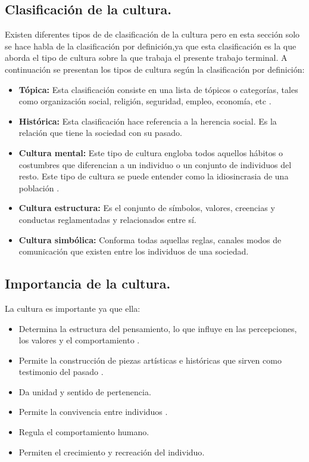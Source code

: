 	\subsection{Clasificación de la cultura.}\label{CulturaClasi}
	Existen diferentes tipos de de clasificación de la cultura pero en esta sección solo 
	se hace habla de la clasificación por definición,ya que esta clasificación es la que 
	aborda el tipo de cultura sobre la que trabaja el presente trabajo terminal. A 
	continuación se presentan los tipos de cultura según la clasificación por definición:
	\begin{itemize}
		\item \textbf{Tópica:} Esta clasificación consiste en una lista de tópicos o 
		categorías, tales como organización social, religión, seguridad, empleo, economía, 
		etc \cite{RefculturaClasificacion}.
		\item \textbf{Histórica:} Esta clasificación hace referencia a la herencia social. 
		Es la relación que tiene la sociedad con su pasado\cite{RefculturaClasificacionEl}. 
		\item \textbf{Cultura mental:} Este tipo de cultura engloba todos aquellos hábitos 
		o costumbres que diferencian a un individuo o un conjunto de individuos del resto. 
		Este tipo de cultura se puede entender como la idiosincrasia de una población
		\cite{RefculturaClasificacion}.
		\item \textbf{Cultura estructura:} Es el conjunto de símbolos, valores, creencias 
		y conductas reglamentadas y relacionados entre sí\cite{RefculturaClasificacionEl}. 
		\item \textbf{Cultura simbólica:} Conforma todas aquellas reglas, canales  modos 
		de comunicación que existen entre los individuos de una 
		sociedad\cite{RefculturaClasificacion}.

	\end{itemize}
	\subsection{Importancia de la cultura.}\label{CulturaImpo}
	La cultura es importante ya que ella:
	\begin{itemize}
		\item Determina la estructura del pensamiento, lo que influye en las percepciones, 
		los valores y el comportamiento \cite{RefImporCul}.
		\item Permite la construcción de piezas artísticas e históricas que sirven como 
		testimonio del pasado \cite{RefImpoCulAr}.		
		\item Da unidad y sentido de pertenencia\cite{RefImpoUnidad}.
		\item Permite la convivencia entre individuos \cite{RefImporCul}.
		\item Regula el comportamiento humano\cite{RefImporCul}.
		\item Permiten el crecimiento y recreación del individuo\cite{RefImpoCulAr}.
	\end{itemize}
	 

	 